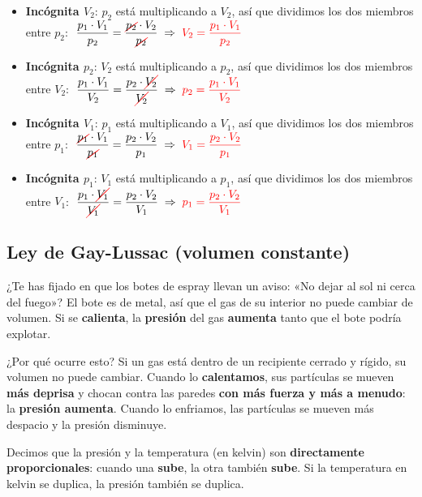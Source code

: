 \begin{itemize}
    \item \textbf{Incógnita \(V_2\)}: \(p_2\) está multiplicando a \(V_2\), así que dividimos los dos miembros entre \(p_2\):
    \(\;\dfrac{p_1 \cdot V_1}{p_2} = \dfrac{\cancelred{p_2} \cdot V_2}{\cancelred{p_2}} \;\Rightarrow\; \textcolor{red}{V_2 = \dfrac{p_1 \cdot V_1}{p_2}}\)
    \item \textbf{Incógnita \(p_2\)}: \(V_2\) está multiplicando a \(p_2\), así que dividimos los dos miembros entre \(V_2\):
    \(\;\dfrac{p_1 \cdot V_1}{V_2} = \dfrac{p_2 \cdot \cancelred{V_2}}{\cancelred{V_2}} \;\Rightarrow\; \textcolor{red}{p_2 = \dfrac{p_1 \cdot V_1}{V_2}}\)
    \item \textbf{Incógnita \(V_1\)}: \(p_1\) está multiplicando a \(V_1\), así que dividimos los dos miembros entre \(p_1\):
    \(\;\dfrac{\cancelred{p_1} \cdot V_1}{\cancelred{p_1}} = \dfrac{p_2 \cdot V_2}{p_1} \;\Rightarrow\; \textcolor{red}{V_1 = \dfrac{p_2 \cdot V_2}{p_1}}\)
    \item \textbf{Incógnita \(p_1\)}: \(V_1\) está multiplicando a \(p_1\), así que dividimos los dos miembros entre \(V_1\):
    \(\;\dfrac{p_1 \cdot \cancelred{V_1}}{\cancelred{V_1}} = \dfrac{p_2 \cdot V_2}{V_1} \;\Rightarrow\; \textcolor{red}{p_1 = \dfrac{p_2 \cdot V_2}{V_1}}\)
\end{itemize}


\subsection{Ley de Gay-Lussac (volumen constante)}

 ¿Te has fijado en que los botes de espray llevan un aviso: «No dejar al sol ni cerca del fuego»? El bote es de metal, así que el gas de su interior no puede cambiar de volumen. Si se \textbf{calienta}, la \textbf{presión} del gas \textbf{aumenta} tanto que el bote podría explotar.

¿Por qué ocurre esto? Si un gas está dentro de un recipiente cerrado y rígido, su volumen no puede cambiar. Cuando lo \textbf{calentamos}, sus partículas se mueven \textbf{más deprisa} y chocan contra las paredes \textbf{con más fuerza y más a menudo}: la \textbf{presión aumenta}. Cuando lo enfriamos, las partículas se mueven más despacio y la presión disminuye.

Decimos que la presión y la temperatura (en kelvin) son \textbf{directamente proporcionales}: cuando una \textbf{sube}, la otra también \textbf{sube}. Si la temperatura en kelvin se duplica, la presión también se duplica.

